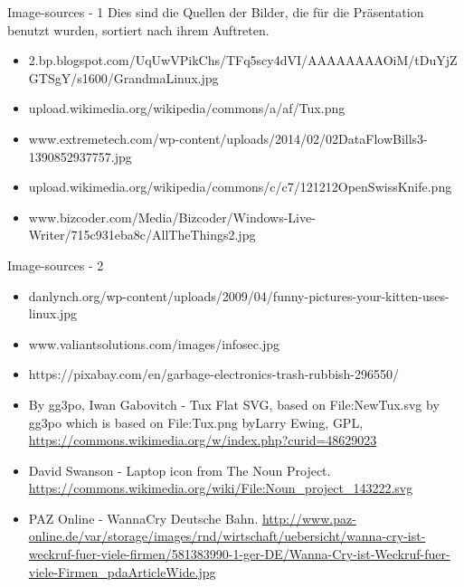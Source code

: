 \begin{frame}{Image-sources - 1}
	Dies sind die Quellen der Bilder, die für die Präsentation benutzt wurden, sortiert nach ihrem Auftreten.
	\begin{itemize}
		\item [1] 2.bp.blogspot.com/\textunderscore UqUwVPikChs/TFq5scy4dVI/AAAAAAAAOiM/tDuYjZGTSgY/s1600/GrandmaLinux.jpg
		\item [2] upload.wikimedia.org/wikipedia/commons/a/af/Tux.png
		\item [3] www.extremetech.com/wp-content/uploads/2014/02/02DataFlowBills3-1390852937757.jpg
		
		\item [4] upload.wikimedia.org/wikipedia/commons/c/c7/121212\textunderscore OpenSwissKnife.png
		\item [5] www.bizcoder.com/Media/Bizcoder/Windows-Live-Writer/715c931eba8c/AllTheThings\textunderscore 2.jpg
	\end{itemize}
\end{frame}

\begin{frame}{Image-sources - 2}
	\begin{itemize}
		\item [6] danlynch.org/wp-content/uploads/2009/04/funny-pictures-your-kitten-uses-linux.jpg
		\item [7] www.valiantsolutions.com/images/infosec.jpg
		\item [8] https://pixabay.com/en/garbage-electronics-trash-rubbish-296550/
		\item [9] By gg3po, Iwan Gabovitch - Tux Flat SVG, based on File:NewTux.svg by gg3po which is based on File:Tux.png byLarry Ewing, GPL, \url{https://commons.wikimedia.org/w/index.php?curid=48629023}
		\item [9] David Swanson - Laptop icon from The Noun Project. \url{https://commons.wikimedia.org/wiki/File:Noun_project_143222.svg}
		\item [10] PAZ Online - WannaCry Deutsche Bahn.
		\url{http://www.paz-online.de/var/storage/images/rnd/wirtschaft/uebersicht/wanna-cry-ist-weckruf-fuer-viele-firmen/581383990-1-ger-DE/Wanna-Cry-ist-Weckruf-fuer-viele-Firmen_pdaArticleWide.jpg}
	\end{itemize}
\end{frame}
